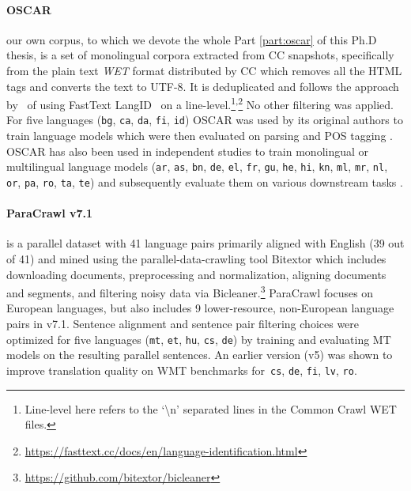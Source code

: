 \paragraph{OSCAR~\citep{ortiz-suarez-etal-2019-asynchronous, ortiz-suarez-etal-2020-monolingual}} our own corpus, to which we devote the whole Part \ref{part:oscar} of this Ph.D thesis, is a set of monolingual corpora extracted from CC snapshots, specifically from the plain text \emph{WET} format distributed by CC which removes all the HTML tags and converts the text to UTF-8. It is deduplicated and follows the approach by~\citep{grave-etal-2018-learning} of using FastText LangID~\citep{joulin-etal-2016-fasttext, joulin-etal-2017-bag} on a line-level.\footnote{Line-level here refers to the `\textbackslash n' separated lines in the Common Crawl WET files.}\textsuperscript{,}\footnote{\url{https://fasttext.cc/docs/en/language-identification.html}} No other filtering was applied. For five languages (\texttt{bg}, \texttt{ca}, \texttt{da}, \texttt{fi}, \texttt{id}) OSCAR was used by its original authors to train language models which were then evaluated on parsing and POS tagging \citep{ortiz-suarez-etal-2020-monolingual}. OSCAR has also been used in independent studies to train monolingual or multilingual language models (\texttt{ar}, \texttt{as}, \texttt{bn}, \texttt{de}, \texttt{el}, \texttt{fr}, \texttt{gu}, \texttt{he}, \texttt{hi}, \texttt{kn}, \texttt{ml}, \texttt{mr}, \texttt{nl}, \texttt{or}, \texttt{pa}, \texttt{ro}, \texttt{ta}, \texttt{te}) and subsequently evaluate them on various downstream tasks \citep{antoun-etal-2021-araelectra, kakwani-etal-2020-indicnlpsuite, wilie-etal-2020-indonlu, chan-etal-2020-germans, koutsikakis-etal-2020-greek, martin-etal-2020-camembert, chriqui-etal-2021-hebert, seker-etal-2021-alephbert, delobelle-etal-2020-robbert, dumitrescu-etal-2020-birth, masala-etal-2020-robert}.


\paragraph{ParaCrawl v7.1} is a parallel dataset with 41 language pairs primarily aligned with English (39 out of 41) and mined using the parallel-data-crawling tool Bitextor \citep{espla-etal-2019-paracrawl,banon-etal-2020-paracrawl} which includes downloading documents, preprocessing and normalization, aligning documents and segments, and filtering noisy data via Bicleaner.\footnote{\url{https://github.com/bitextor/bicleaner}}
ParaCrawl focuses on European languages, but also includes 9 lower-resource, non-European language pairs in v7.1. Sentence alignment and sentence pair filtering choices were optimized for five languages (\texttt{mt}, \texttt{et}, \texttt{hu}, \texttt{cs}, \texttt{de}) by training and evaluating MT models on the resulting parallel sentences. An earlier version (v5) was shown to improve translation quality on WMT benchmarks for~\texttt{cs}, \texttt{de}, \texttt{fi}, \texttt{lv}, \texttt{ro}.


